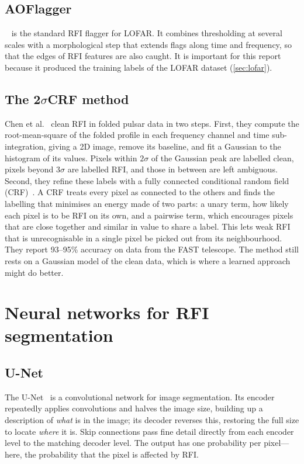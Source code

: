 \subsection{AOFlagger}
\aoflagger{}~\cite{offringa2012} is the standard RFI flagger for LOFAR. It
combines thresholding at several scales with a morphological step that
extends flags along time and frequency, so that the edges of RFI features are
also caught. It is important for this report because it produced the
training labels of the LOFAR dataset (\cref{sec:lofar}).

\subsection{The 2\texorpdfstring{$\sigma$}{-sigma}CRF method}
Chen et al.~\cite{chen2023} clean RFI in folded pulsar data in two steps.
First, they compute the root-mean-square of the folded profile in each
frequency channel and time sub-integration, giving a 2D image, remove its
baseline, and fit a Gaussian to the histogram of its values. Pixels within
$2\sigma$ of the Gaussian peak are labelled clean, pixels beyond $3\sigma$ are
labelled RFI, and those in between are left ambiguous. Second, they refine
these labels with a fully connected conditional random field
(CRF)~\cite{krahenbuhl2011}. A CRF treats every pixel as connected to the
others and finds the labelling that minimises an energy made of two parts: a
unary term, how likely each pixel is to be RFI on its own, and a pairwise
term, which encourages pixels that are close together and similar in value to
share a label. This lets weak RFI that is unrecognisable in a single pixel be
picked out from its neighbourhood. They report 93--95\% accuracy on data from
the FAST telescope. The method still rests on a Gaussian model of the clean
data, which is where a learned approach might do better.

\section{Neural networks for RFI segmentation}

\subsection{U-Net}
The U-Net~\cite{ronneberger2015} is a convolutional network for image
segmentation. Its encoder repeatedly applies convolutions and halves the image
size, building up a description of \emph{what} is in the image; its decoder
reverses this, restoring the full size to locate \emph{where} it is. Skip
connections pass fine detail directly from each encoder level to the matching
decoder level. The output has one probability per pixel---here, the
probability that the pixel is affected by RFI.

